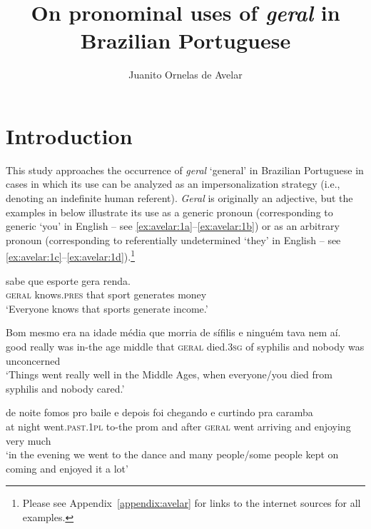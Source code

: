 \documentclass[output=paper]{langscibook}
\author{Juanito {Ornelas de Avelar}\orcid{}\affiliation{University of Campinas}}
\title {On pronominal uses of \textit{geral} in Brazilian Portuguese}
\begin{document}
\AffiliationsWithoutIndexing{}
\maketitle 

\section{Introduction}

This study approaches the occurrence of \textit{geral} ‘general’ in Brazilian Portuguese in cases in which its use can be analyzed as an impersonalization strategy (i.e., denoting an indefinite human referent). \textit{Geral} is originally an adjective, but the examples in  below illustrate its use as a generic pronoun (corresponding to generic ‘you’ in English – see \ref{ex:avelar:1a}--\ref{ex:avelar:1b}) or as an arbitrary pronoun (corresponding to referentially undetermined ‘they’ in English – see \ref{ex:avelar:1c}--\ref{ex:avelar:1d}).\footnote{Please see Appendix~\ref{appendix:avelar} for links to the internet sources for all examples.}

\ea\label{ex:avelar:1} 
 \ea\label{ex:avelar:1a}
  \gll {} sabe que esporte gera renda.%
  \\
         \textsc{geral} knows.\textsc{pres} that sport generates money\\
   \glt ‘Everyone knows that sports generate income.’

 \ex\label{ex:avelar:1b}
   \gll Bom mesmo era na {idade média} que  morria de sífilis e     ninguém tava {nem aí}. %
   \\
          good really was in-the {age middle} that \textsc{geral} died.\textsc{3sg} of syphilis and nobody was unconcerned %
          \\
   \glt ‘Things went really well in the Middle Ages, when everyone/you died from syphilis and nobody cared.’

 \ex\label{ex:avelar:1c} 
  \gll de noite fomos pro baile e depois  foi chegando e curtindo pra caramba %
 \\
         at night went.\textsc{past.1pl} to-the prom and after \textsc{geral} went   arriving and enjoying very much\\
  \glt‘in the evening we went to the dance and many people/some people kept on coming and enjoyed it a lot’
\end{document}
